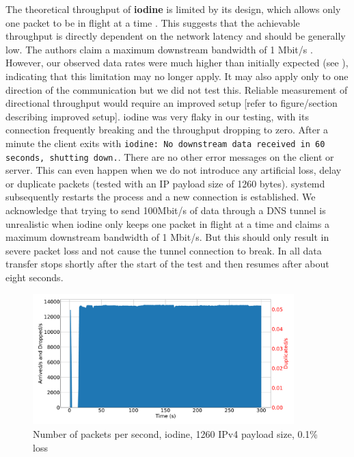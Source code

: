The theoretical throughput of \textbf{iodine} is limited by its design, which allows only one packet to be in flight at a time \cite{iodine-README}.
This suggests that the achievable throughput is directly dependent on the network latency and should be generally low.
The authors claim a maximum downstream bandwidth of 1 Mbit/s \cite{iodine-homepage}.
However, our observed data rates were much higher than initially expected (see ), indicating that this limitation may no longer apply.
It may also apply only to one direction of the communication but we did not test this.
Reliable measurement of directional throughput would require an improved setup [refer to figure/section describing improved setup].
iodine was very flaky in our testing, with its connection frequently breaking and the throughput dropping to zero.
After a minute the client exits with \texttt{iodine: No downstream data received in 60 seconds, shutting down.}.
There are no other error messages on the client or server.
This can even happen when we do not introduce any artificial loss, delay or duplicate packets (tested with an IP payload size of 1260 bytes).
systemd subsequently restarts the process and a new connection is established.
We acknowledge that trying to send 100Mbit/s of data through a DNS tunnel is unrealistic when iodine only keeps one packet in flight at a time and claims a maximum downstream bandwidth of 1 Mbit/s.
But this should only result in severe packet loss and not cause the tunnel connection to break.
In  all data transfer stops shortly after the start of the test and then resumes after about eight seconds.
\begin{figure}[tbh]
	\centering
	\includegraphics[draft=false,width=0.9\textwidth]{figures/Graphs/graph-2-iodine-dropout/packet_counts_all.pdf}
	\caption{Number of packets per second, iodine, 1260 IPv4 payload size, 0.1\% loss}
	\label{fig:graph-2-iodine-dropout-packets}
\end{figure}

